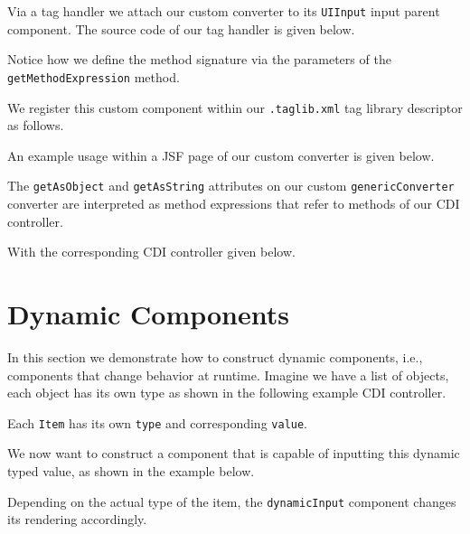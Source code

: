 Via a tag handler we attach our custom converter to its \texttt{UIInput} input parent component.
The source code of our tag handler is given below.

Notice how we define the method signature via the parameters of the \texttt{getMethodExpression} method.

We register this custom component within our \texttt{.taglib.xml} tag library descriptor as follows.


An example usage within a JSF page of our custom converter is given below.

The \texttt{getAsObject} and \texttt{getAsString} attributes on our custom \texttt{genericConverter} converter are interpreted as method expressions that refer to methods of our CDI controller.

With the corresponding CDI controller given below.



\section{Dynamic Components}
In this section we demonstrate how to construct dynamic components, i.e., components that change behavior at runtime.
Imagine we have a list of objects, each object has its own type as shown in the following example CDI controller.

Each \texttt{Item} has its own \texttt{type} and corresponding \texttt{value}.

We now want to construct a component that is capable of inputting this dynamic typed value, as shown in the example below.

Depending on the actual type of the item, the \texttt{dynamicInput} component changes its rendering accordingly.

